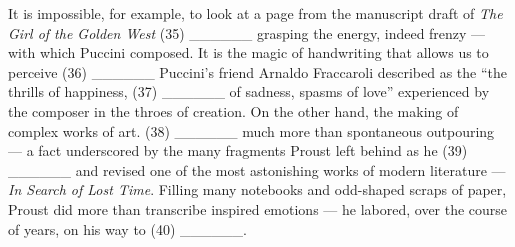 \documentclass[UTF8,11pt]{ctexart}
\begin{document}
It is impossible, for example, to look at a page from the manuscript draft of \textit{The Girl of the Golden West} (35) \_\_\_\_\_\_ grasping the energy, indeed frenzy — with which Puccini composed. It is the magic of handwriting that allows us to perceive (36) \_\_\_\_\_\_ Puccini’s friend Arnaldo Fraccaroli described as the “the thrills of happiness, (37) \_\_\_\_\_\_ of sadness, spasms of love” experienced by the composer in the throes of creation. On the other hand, the making of complex works of art. (38) \_\_\_\_\_\_ much more than spontaneous outpouring — a fact underscored by the many fragments Proust left behind as he (39) \_\_\_\_\_\_ and revised one of the most astonishing works of modern literature — \textit{In Search of Lost Time}. Filling many notebooks and odd-shaped scraps of paper, Proust did more than transcribe inspired emotions — he labored, over the course of years, on his way to (40) \_\_\_\_\_\_.
\end{document}
